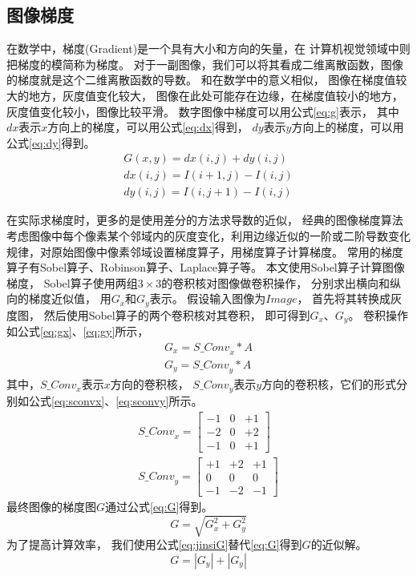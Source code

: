 \subsection{图像梯度}
\label{subsection:tidu}

在数学中，梯度(Gradient)是一个具有大小和方向的矢量，在
计算机视觉领域中则把梯度的模简称为梯度。
对于一副图像，我们可以将其看成二维离散函数，图像的梯度就是这个二维离散函数的导数。
和在数学中的意义相似，
图像在梯度值较大的地方，灰度值变化较大，
图像在此处可能存在边缘，在梯度值较小的地方，
灰度值变化较小，图像比较平滑。
数字图像中梯度可以用公式\eqref{eq:g}表示，
其中$dx$表示$x$方向上的梯度，可以用公式\eqref{eq:dx}得到，
$dy$表示$y$方向上的梯度，可以用公式\eqref{eq:dy}得到。
\begin{gather}
G(x,y)=dx(i,j)+dy(i,j)\label{eq:g}\\
dx(i,j)=I(i+1,j)-I(i,j)\label{eq:dx}\\
dy(i,j)=I(i,j+1)-I(i,j)\label{eq:dy}
\end{gather}

在实际求梯度时，更多的是使用差分的方法求导数的近似，
经典的图像梯度算法考虑图像中每个像素某个邻域内的灰度变化，利用边缘近似的一阶或二阶导数变化规律，对原始图像中像素邻域设置梯度算子，用梯度算子计算梯度。
常用的梯度算子有Sobel算子\cite{russ2016image}、Robinson算子\cite{russ2016image}、Laplace算子\cite{russ2016image}等。
本文使用Sobel算子计算图像梯度，
Sobel算子使用两组$3\times 3$的卷积核对图像做卷积操作，
分别求出横向和纵向的梯度近似值，
用$G_x$和$G_y$表示。
假设输入图像为$Image$，
首先将其转换成灰度图，
然后使用Sobel算子的两个卷积核对其卷积，
即可得到$G_x$、$G_y$。
卷积操作如公式\eqref{eq:gx}、\eqref{eq:gy}所示，
\begin{gather}
G_x={S\_Conv}_x*A\label{eq:gx}\\
G_y={S\_Conv}_y*A\label{eq:gy}
\end{gather}
其中，${S\_Conv}_x$表示$x$方向的卷积核，
${S\_Conv}_y$表示$y$方向的卷积核，它们的形式分别如公式\eqref{eq:sconvx}、\eqref{eq:sconvy}所示。
\begin{gather}
{S\_Conv}_x=\begin{bmatrix} -1 & 0 & +1 \\ -2 & 0 & +2\\-1 & 0 & +1\end{bmatrix}  \label{eq:sconvx}\\
{S\_Conv}_y=\begin{bmatrix} +1 & +2 & +1 \\ 0 & 0 & 0\\-1 & -2 & -1\end{bmatrix}  \label{eq:sconvy}
\end{gather}
最终图像的梯度图$G$通过公式\eqref{eq:G}得到。
\begin{equation}
G=\sqrt{G_x^2+G_y^2} \label{eq:G}
\end{equation}
为了提高计算效率，
我们使用公式\eqref{eq:jinsiG}替代\eqref{eq:G}得到$G$的近似解。
\begin{equation}
G= \left| {G}_{y} \right|+ \left| {G}_{y} \right|
\label{eq:jinsiG}
\end{equation}

